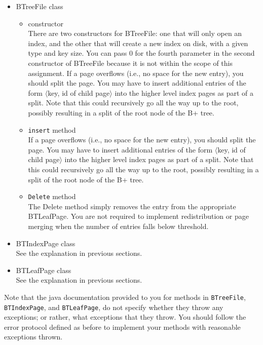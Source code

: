 \begin{itemize}
\item BTreeFile class\\

\begin{itemize}
\item constructor \\
There are two constructors for BTreeFile: one that will only
open an index, and the other that will create a new index on
disk, with a given type and key size.  You can pass 0 for the
fourth parameter in the second constructor of BTreeFile because
it is not within the scope of this assignment.
If a page overflows (i.e., no space for the new entry), 
you should split the page. 
You may have to insert additional entries of the form
$\langle$key, id of child page$\rangle$ into the higher level
index pages as part of a split.
Note that this could recursively go all the way up to the root, possibly
resulting in a split of the root node of the B+ tree. \\

\item \verb+insert+ method \\
If a page overflows (i.e., no space for the new entry),
you should split the page.
You may have to insert additional entries of the form
$\langle$key, id of child page$\rangle$ into the higher level
index pages as part of a split.
Note that this could recursively go all the way up to the root, possibly
resulting in a split of the root node of the B+ tree.

\item \verb+Delete+ method \\
The Delete method simply
removes the entry from the appropriate BTLeafPage.  You are not required
to implement redistribution or
page merging when the number of entries falls below threshold.
\end{itemize}

\item BTIndexPage class \\
See the explanation in previous sections.

\item BTLeafPage class \\
See the explanation in previous sections.
\end{itemize}

Note that the java documentation provided to you for methods in
\verb+BTreeFile+,  
\verb+BTIndexPage+, and 
\verb+BTLeafPage+,  
do not specify whether they throw any exceptions; or rather,
what exceptions that they throw.  You should follow the error
protocol defined as before to implement your methods with
reasonable exceptions thrown.

